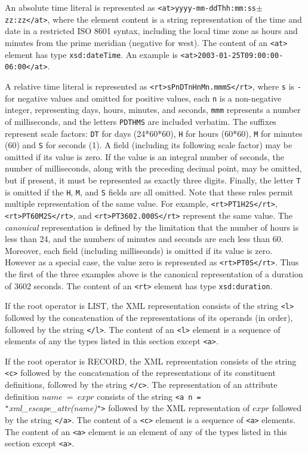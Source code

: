 \documentclass{article}
\begin{document}
An absolute time literal is represented as
\texttt{<at>yyyy-mm-ddThh:mm:ss$\pm$zz:zz</at>}, where the element content is a
string representation of the time and date in a restricted ISO 8601 syntax,
including the local time zone as hours and minutes from the prime
meridian (negative for west).
The content of an \verb/<at>/ element has type \verb/xsd:dateTime/.
An example is \verb|<at>2003-01-25T09:00:00-06:00</at>|.

A relative time literal is represented as \texttt{<rt>sPnDTnHnMn.mmmS</rt>},
where \texttt{s} is \texttt{-} for negative values and omitted for positive
values, each \texttt{n} is a non-negative integer, representing
days, hours, minutes, and seconds, \texttt{mmm} represents a number
of milliseconds, and the letters \verb/PDTHMS/ are included verbatim.
The suffixes represent scale factors: \verb/DT/ for days (24*60*60),
\verb/H/ for hours (60*60), \verb/M/ for minutes (60) and \verb/S/ for
seconds (1).  A field (including its following scale factor)
may be omitted if its value is zero.  If the value is an integral number of
seconds, the number of milliseconds, along with the preceding decimal point,
may be omitted, but if present, it must be represented as exactly three
digits.  Finally, the letter \verb/T/ is omitted if the \verb/H/, \verb/M/,
and \verb/S/ fields are all omitted.
Note that these rules permit multiple representation of the same value. 
For example,
\texttt{<rt>PT1H2S</rt>},
\texttt{<rt>PT60M2S</rt>}, and
\texttt{<rt>PT3602.000S</rt>} represent the same value.
The \emph{canonical} representation is defined by the limitation that the
number of hours is less than 24, and the numbers of minutes and seconds are
each less than 60.  Moreover, each field (including milliseonds) is omitted if
its value is zero.  However as a special case, the value zero is represented as 
\texttt{<rt>PT0S</rt>}.  Thus the first of the three examples above is the
canonical representation of a duration of 3602 seconds.
The content of an \verb/<rt>/ element has type \verb/xsd:duration/.

If the root operator is LIST, the XML representation consists of the string
\verb|<l>| followed by the concatenation of the representations of its 
operands (in order), followed by the string \verb|</l>|.
The content of an \verb/<l>/ element is a sequence of elements of any the
types listed in this section except \verb/<a>/.

If the root operator is RECORD, the XML representation consists of the string
\verb|<c>| followed by the concatenation of the representations of its 
constituent definitions, followed by the string \verb|</c>|.
The representation of an attribute definition $name~=~expr$ consists of the
string \verb|<a n = "|\emph{xml\_escape\_attr(name)}\verb|">| followed by the
XML representation of $expr$ followed by the string \verb|</a>|.
The content of a \verb/<c>/ element is a sequence of \verb/<a>/ elements.
The content of an \verb/<a>/ element is an element of any of the types
listed in this section except \verb/<a>/.
\end{document}
